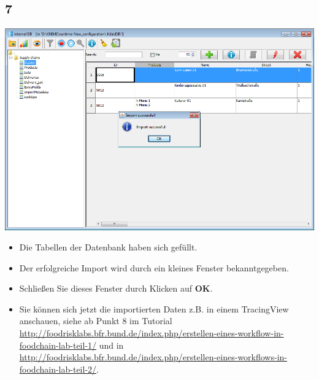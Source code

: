 \documentclass{beamer}
\begin{document}
\subsection{7}
\begin{frame}
	\begin{center}
  		\includegraphics[height=0.6\textheight]{7.png}
	\end{center}
	\begin{itemize}
		\item Die Tabellen der Datenbank haben sich gefüllt.
		\item Der erfolgreiche Import wird durch ein kleines Fenster  bekanntgegeben.
        \item Schließen Sie dieses Fenster durch Klicken auf \textbf{OK}.
        \item Sie können sich jetzt die importierten Daten z.B. in einem TracingView anschauen, siehe ab Punkt 8 im Tutorial \url{http://foodrisklabs.bfr.bund.de/index.php/erstellen-eines-workflow-in-foodchain-lab-teil-1/} und in \url{http://foodrisklabs.bfr.bund.de/index.php/erstellen-eines-workflows-in-foodchain-lab-teil-2/}.
	\end{itemize}
\end{frame}
\end{document}
